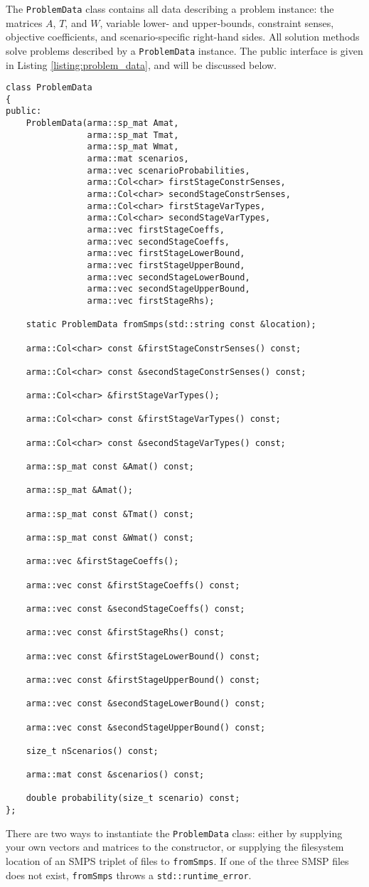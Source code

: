 \documentclass[12pt, english]{article}
\begin{document}
The \texttt{ProblemData} class contains all data describing a problem instance: the matrices $A$, $T$, and $W$, variable lower- and upper-bounds, constraint senses, objective coefficients, and scenario-specific right-hand sides. All solution methods solve problems described by a \texttt{ProblemData} instance. The public interface is given in Listing \ref{listing:problem_data}, and will be discussed below.
\begin{lstlisting}[caption={Public interface of the \texttt{ProblemData} class.},
                   label={listing:problem_data}]
class ProblemData
{
public:
    ProblemData(arma::sp_mat Amat,
				arma::sp_mat Tmat,
				arma::sp_mat Wmat,
				arma::mat scenarios,
				arma::vec scenarioProbabilities,
				arma::Col<char> firstStageConstrSenses,
				arma::Col<char> secondStageConstrSenses,
				arma::Col<char> firstStageVarTypes,
				arma::Col<char> secondStageVarTypes,
				arma::vec firstStageCoeffs,
				arma::vec secondStageCoeffs,
				arma::vec firstStageLowerBound,
				arma::vec firstStageUpperBound,
				arma::vec secondStageLowerBound,
				arma::vec secondStageUpperBound,
				arma::vec firstStageRhs);

	static ProblemData fromSmps(std::string const &location);
	
	arma::Col<char> const &firstStageConstrSenses() const;
	
	arma::Col<char> const &secondStageConstrSenses() const;
	
	arma::Col<char> &firstStageVarTypes();
	
	arma::Col<char> const &firstStageVarTypes() const;
	
	arma::Col<char> const &secondStageVarTypes() const;
		
	arma::sp_mat const &Amat() const;
	
	arma::sp_mat &Amat();
	
	arma::sp_mat const &Tmat() const;
	
	arma::sp_mat const &Wmat() const;
	
	arma::vec &firstStageCoeffs();
	
	arma::vec const &firstStageCoeffs() const;
	
	arma::vec const &secondStageCoeffs() const;
	
	arma::vec const &firstStageRhs() const;
	
	arma::vec const &firstStageLowerBound() const;
	
	arma::vec const &firstStageUpperBound() const;
	
	arma::vec const &secondStageLowerBound() const;
	
	arma::vec const &secondStageUpperBound() const;
	
	size_t nScenarios() const;
	
	arma::mat const &scenarios() const;
	
	double probability(size_t scenario) const;
};
\end{lstlisting}
There are two ways to instantiate the \texttt{ProblemData} class: either by supplying your own vectors and matrices to the constructor, or supplying the filesystem location of an SMPS triplet of files to \texttt{fromSmps}. If one of the three SMSP files does not exist, \texttt{fromSmps} throws a \texttt{std::runtime\_error}.
\end{document}
